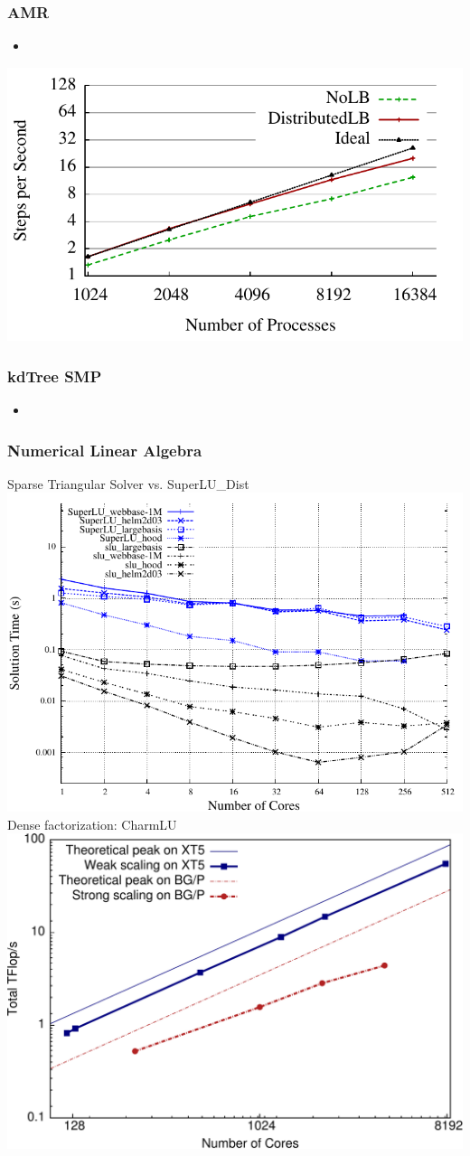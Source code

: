 \begin{frame}
\frametitle{AMR}
%
\begin{itemize}
\item
\end{itemize}
%
\includegraphics[scale=0.7]{../figures/amr_scaling_distlb.pdf}
\end{frame}

\begin{frame}
\frametitle{kdTree SMP}
\begin{itemize}
\item
\end{itemize}
%
\end{frame}

\begin{frame}
\frametitle{Numerical Linear Algebra}
%
Sparse Triangular Solver vs. SuperLU\_Dist
\includegraphics[scale=0.45]{../figures/sparselu_superlu_comparison.pdf}\\
Dense factorization: CharmLU
\includegraphics[scale=0.2]{../figures/charmlu_scaling.pdf}
\end{frame}

